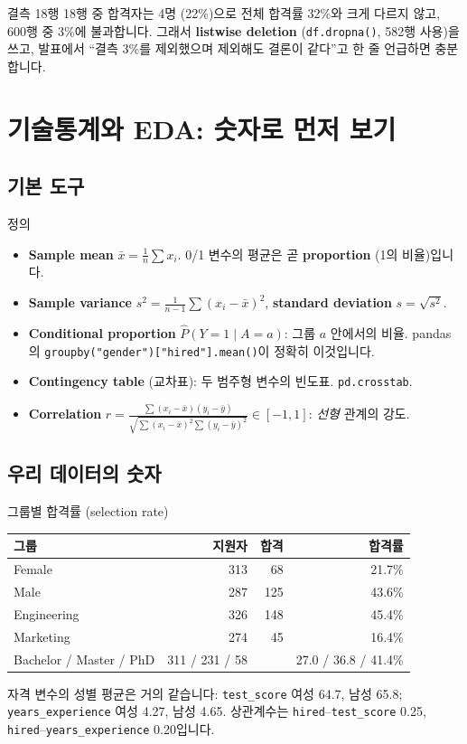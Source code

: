 \documentclass[11pt,a4paper]{article}
\newcommand{\term}[1]{\textbf{#1}}
\newcommand{\code}[1]{\texttt{#1}}
\begin{document}
\begin{databox}{결측 18행}
18행 중 합격자는 4명 (22\%)으로 전체 합격률 32\%와 크게 다르지 않고, 600행 중 3\%에 불과합니다. 그래서 \term{listwise deletion} (\code{df.dropna()}, 582행 사용)을 쓰고, 발표에서 ``결측 3\%를 제외했으며 제외해도 결론이 같다''고 한 줄 언급하면 충분합니다.
\end{databox}

\section{기술통계와 EDA: 숫자로 먼저 보기}

\subsection{기본 도구}
\begin{defbox}{정의}
\begin{itemize}
\item \term{Sample mean} $\bar x=\frac1n\sum x_i$. 0/1 변수의 평균은 곧 \term{proportion} (1의 비율)입니다.
\item \term{Sample variance} $s^2=\frac1{n-1}\sum(x_i-\bar x)^2$, \term{standard deviation} $s=\sqrt{s^2}$.
\item \term{Conditional proportion} $\hat P(Y=1\mid A=a)$: 그룹 $a$ 안에서의 비율. pandas의 \code{groupby("gender")["hired"].mean()}이 정확히 이것입니다.
\item \term{Contingency table} (교차표): 두 범주형 변수의 빈도표. \code{pd.crosstab}.
\item \term{Correlation} $r=\frac{\sum(x_i-\bar x)(y_i-\bar y)}{\sqrt{\sum(x_i-\bar x)^2\sum(y_i-\bar y)^2}}\in[-1,1]$: \emph{선형} 관계의 강도.
\end{itemize}
\end{defbox}

\subsection{우리 데이터의 숫자}
\begin{databox}{그룹별 합격률 (selection rate)}
\begin{center}
\begin{tabular}{@{}l r r r@{}}
\toprule
그룹 & 지원자 & 합격 & 합격률 \\
\midrule
Female & 313 & 68 & 21.7\% \\
Male & 287 & 125 & 43.6\% \\
\midrule
Engineering & 326 & 148 & 45.4\% \\
Marketing & 274 & 45 & 16.4\% \\
\midrule
Bachelor / Master / PhD & 311 / 231 / 58 & & 27.0 / 36.8 / 41.4\% \\
\bottomrule
\end{tabular}
\end{center}
자격 변수의 성별 평균은 거의 같습니다: \code{test\_score} 여성 64.7, 남성 65.8; \code{years\_experience} 여성 4.27, 남성 4.65. 상관계수는 \code{hired}–\code{test\_score} 0.25, \code{hired}–\code{years\_experience} 0.20입니다.
\end{databox}
\end{document}
